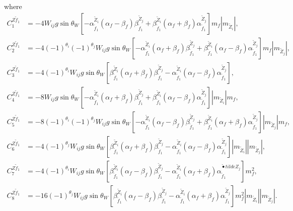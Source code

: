 \documentclass[final,3p,times]{elsarticle}
\begin{document}
where
\begin{align}
C_{1}^{Z \tilde{f}_1} &= -4W_{ij}g \sin\theta_W [-{\alpha_{\tilde{f}_1}^{\tilde{Z}_i}}(\alpha_f-\beta_f){\beta_{\tilde{f}_1}^{\tilde{Z}_j}} + {\beta_{\tilde{f}_1}^{\tilde{Z}_i}}(\alpha_f+\beta_f){\alpha_{\tilde{f}_1}^{\tilde{Z}_j}}]m_{f}|m_{\tilde{Z}_i}|, \\
C_{2}^{Z \tilde{f}_1} &= -4(-1)^{\theta_i}(-1)^{\theta_j}W_{ij}g \sin\theta_W [-{\alpha_{\tilde{f}_1}^{\tilde{Z}_i}}(\alpha_f+\beta_f){\beta_{\tilde{f}_1}^{\tilde{Z}_j}} + {\beta_{\tilde{f}_1}^{\tilde{Z}_i}}(\alpha_f-\beta_f){\alpha_{\tilde{f}_1}^{\tilde{Z}_j}}]m_{f}|m_{\tilde{Z}_j}|, \\
C_{3}^{Z \tilde{f}_1} &= -4(-1)^{\theta_i}W_{ij}g \sin\theta_W [{\beta_{\tilde{f}_1}^{\tilde{Z}_i}}(\alpha_f + \beta_f){\beta_{\tilde{f}_1}^{\tilde{Z}_j}} - {\alpha_{\tilde{f}_1}^{\tilde{Z}_i}}(\alpha_f - \beta_f){\alpha_{\tilde{f}_1}^{\tilde{Z}_j}}], \\
C_{4}^{Z \tilde{f}_1} &= -8W_{ij}g \sin\theta_W [-{\alpha_{\tilde{f}_1}^{\tilde{Z}_i}}(\alpha_f + \beta_f){\beta_{\tilde{f}_1}^{\tilde{Z}_j}} + {\beta_{\tilde{f}_1}^{\tilde{Z}_i}}(\alpha_f - \beta_f){\alpha_{\tilde{f}_1}^{\tilde{Z}_j}}]|m_{\tilde{Z}_i}|m_{f}, \\
C_{5}^{Z \tilde{f}_1} &= -8(-1)^{\theta_i}(-1)^{\theta_j}W_{ij}g \sin\theta_W [-{\alpha_{\tilde{f}_1}^{\tilde{Z}_i}}(\alpha_f - \beta_f){\beta_{\tilde{f}_1}^{\tilde{Z}_j}} + {\beta_{\tilde{f}_1}^{\tilde{Z}_i}}(\alpha_f + \beta_f){\alpha_{\tilde{f}_1}^{\tilde{Z}_j}}]|m_{\tilde{Z}_j}|m_{f}, \\
C_{6}^{Z \tilde{f}_1} &= -4(-1)^{\theta_j}W_{ij}g \sin\theta_W [{\beta_{\tilde{f}_1}^{\tilde{Z}_i}}(\alpha_f + \beta_f){\beta_{\tilde{f}_1}^{\tilde{Z}_j}} - {\alpha_{\tilde{f}_1}^{\tilde{Z}_i}}(\alpha_f - \beta_f){\alpha_{\tilde{f}_1}^{\tilde{Z}_j}}]|m_{\tilde{Z}_i}||m_{\tilde{Z}_j}|, \\
C_{7}^{Z \tilde{f}_1} &= -4(-1)^{\theta_i}W_{ij}g \sin\theta_W [{\beta_{\tilde{f}_1}^{\tilde{Z}_i}}(\alpha_f - \beta_f){\beta_{\tilde{f}_1}^{\tilde{Z}_j}} - {\alpha_{\tilde{f}_1}^{\tilde{Z}_i}}(\alpha_f + \beta_f){\alpha_{\tilde{f}_1}^{\tilde{•}tilde{Z}_j}}]m_{f}^2, \\
C_{8}^{Z \tilde{f}_1} &= -16(-1)^{\theta_j}W_{ij}g \sin\theta_W [{\beta_{\tilde{f}_1}^{\tilde{Z}_i}}(\alpha_f - \beta_f){\beta_{\tilde{f}_1}^{\tilde{Z}_j}} - {\alpha_{\tilde{f}_1}^{\tilde{Z}_i}}(\alpha_f + \beta_f){\alpha_{\tilde{f}_1}^{\tilde{Z}_j}}]m_{f}^2 |m_{\tilde{Z}_i}||m_{\tilde{Z}_j}|.
\end{align}
\end{document}
